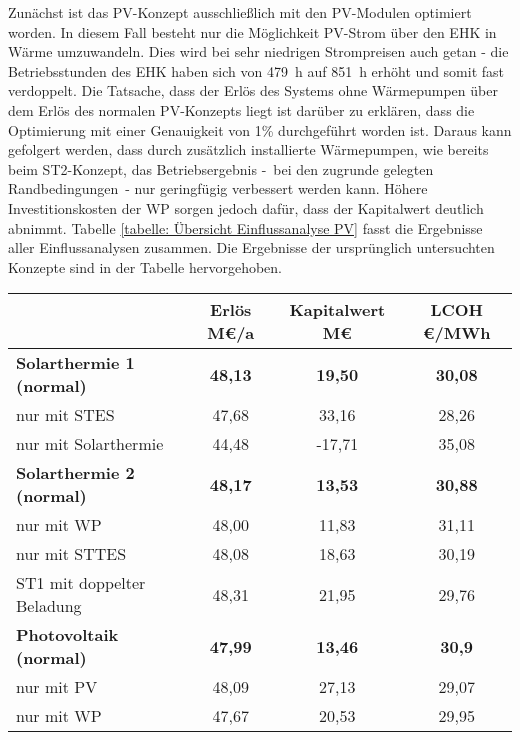 Zunächst ist das PV-Konzept ausschließlich mit den \ac{PV}-Modulen optimiert worden. In diesem Fall besteht nur die Möglichkeit \ac{PV}-Strom über den \ac{EHK} in Wärme umzuwandeln. Dies wird bei sehr niedrigen Strompreisen auch getan - die Betriebsstunden des \ac{EHK} haben sich von 479~h auf 851~h erhöht und somit fast verdoppelt. Die Tatsache, dass der Erlös des Systems ohne Wärmepumpen über dem Erlös des normalen \ac{PV}-Konzepts liegt ist darüber zu erklären, dass die Optimierung mit einer Genauigkeit von 1\% durchgeführt worden ist. Daraus kann gefolgert werden, dass durch zusätzlich installierte Wärmepumpen, wie bereits beim ST2-Konzept, das Betriebsergebnis -~bei den zugrunde gelegten Randbedingungen~- nur geringfügig verbessert werden kann. Höhere Investitionskosten der \ac{WP} sorgen jedoch dafür, dass der Kapitalwert deutlich abnimmt. Tabelle \ref{tabelle: Übersicht Einflussanalyse PV} fasst die Ergebnisse aller Einflussanalysen zusammen. Die Ergebnisse der ursprünglich untersuchten Konzepte sind in der Tabelle hervorgehoben.
	\begin{center}
		\label{tabelle: Übersicht Einflussanalyse PV}
		\begin{tabular}{lcccc}
			\hline 
			&  & Erlös M\euro/a & Kapitalwert M\euro & \ac{LCOH} \euro/MWh\tabularnewline
			
			\hline 
			\textbf{Solarthermie 1 (normal)}  &  & \textbf{48,13} & \textbf{19,50} & \textbf{30,08} \tabularnewline
			nur mit \ac{STES}		 &  & 47,68 & 33,16 & 28,26 \tabularnewline
			nur mit Solarthermie 	 &  & 44,48 & -17,71 & 35,08 \tabularnewline
			\textbf{Solarthermie 2 (normal)}  &  & \textbf{48,17} & \textbf{13,53} & \textbf{30,88} \tabularnewline
			nur mit \ac{WP}			 &  & 48,00 & 11,83 & 31,11\tabularnewline
			nur mit \ac{STTES} 		 &  & 48,08 & 18,63 & 30,19\tabularnewline
			ST1 mit doppelter Beladung 		 &  & 48,31 & 21,95 & 29,76\tabularnewline
			\textbf{Photovoltaik (normal) }   &  &\textbf{47,99} & \textbf{13,46} & \textbf{30,9} \tabularnewline
			nur mit \ac{PV} 		 &  & 48,09 & 27,13 & 29,07\tabularnewline
			nur mit \ac{WP}			 &  & 47,67 & 20,53 & 29,95\tabularnewline
			\hline
		\end{tabular}
	\end{center} 
